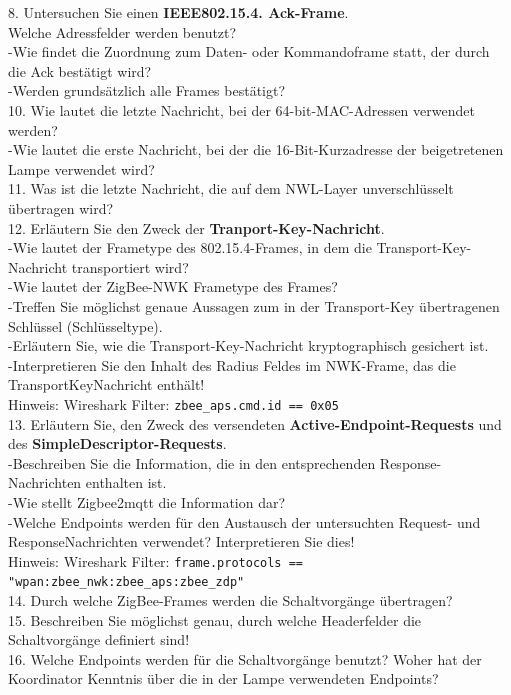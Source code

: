 \begin{Fragen}
    8. Untersuchen Sie einen \textbf{IEEE802.15.4. Ack-Frame}.\\
    Welche Adressfelder werden benutzt? \\
    -Wie findet die Zuordnung zum Daten- oder Kommandoframe statt, der durch die Ack bestätigt wird? \\
    -Werden grundsätzlich alle Frames bestätigt?\\
    
    10. Wie lautet die letzte Nachricht, bei der 64-bit-MAC-Adressen verwendet werden?\\
    -Wie lautet die erste Nachricht, bei der die 16-Bit-Kurzadresse der beigetretenen Lampe verwendet wird?\\
    
    11. Was ist die letzte Nachricht, die auf dem NWL-Layer unverschlüsselt übertragen wird?\\
    
    12. Erläutern Sie den Zweck der \textbf{Tranport-Key-Nachricht}.\\
    -Wie lautet der Frametype des 802.15.4-Frames, in dem die Transport-Key-Nachricht transportiert wird? \\
    -Wie lautet der ZigBee-NWK Frametype des Frames?\\
    -Treffen Sie möglichst genaue Aussagen zum in der Transport-Key übertragenen Schlüssel (Schlüsseltype). \\
    -Erläutern Sie, wie die Transport-Key-Nachricht kryptographisch gesichert ist.\\
    -Interpretieren Sie den Inhalt des Radius Feldes im NWK-Frame, das die TransportKeyNachricht enthält!\\
    Hinweis: Wireshark Filter: \verb|zbee_aps.cmd.id == 0x05|\\
    
    13. Erläutern Sie, den Zweck des versendeten \textbf{Active-Endpoint-Requests} und des \textbf{SimpleDescriptor-Requests}.\\
    -Beschreiben Sie die Information, die in den entsprechenden Response-Nachrichten enthalten ist.\\ 
    -Wie stellt Zigbee2mqtt die Information dar?\\
    -Welche Endpoints werden für den Austausch der untersuchten Request- und ResponseNachrichten verwendet? Interpretieren Sie dies!\\
    Hinweis: Wireshark Filter: \verb|frame.protocols == "wpan:zbee_nwk:zbee_aps:zbee_zdp"|\\
     
    14. Durch welche ZigBee-Frames werden die Schaltvorgänge übertragen? \\
    
    15. Beschreiben Sie möglichst genau, durch welche Headerfelder die Schaltvorgänge definiert sind! \\
        
    16. Welche Endpoints werden für die Schaltvorgänge benutzt? Woher hat der Koordinator Kenntnis über die in der Lampe verwendeten Endpoints? \\
\end{Fragen}
